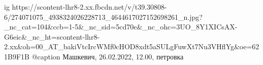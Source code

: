  
 
 
 
 

\ifcmt
  ig https://scontent-lhr8-2.xx.fbcdn.net/v/t39.30808-6/274071075_4938324026228713_4644617027152698261_n.jpg?_nc_cat=104&ccb=1-5&_nc_sid=5cd70e&_nc_ohc=3UO_8Y1XICsAX-G6eic&_nc_ht=scontent-lhr8-2.xx&oh=00_AT_bakiVtcIrcWMf0cHOD8xdt5aSULgFuwXt7Nu3VHflYg&oe=621B9F1B
  @caption Машкевич, 26.02.2022, 12.00, петровка 
\fi

